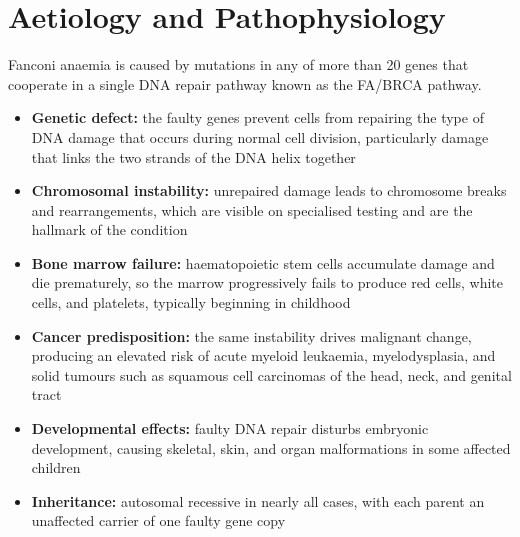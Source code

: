 \section*{Aetiology and Pathophysiology}
Fanconi anaemia is caused by mutations in any of more than 20 genes that cooperate in a single DNA repair pathway known as the FA/BRCA pathway.
\begin{itemize}
    \item \textbf{Genetic defect:} the faulty genes prevent cells from repairing the type of DNA damage that occurs during normal cell division, particularly damage that links the two strands of the DNA helix together
    \item \textbf{Chromosomal instability:} unrepaired damage leads to chromosome breaks and rearrangements, which are visible on specialised testing and are the hallmark of the condition
    \item \textbf{Bone marrow failure:} haematopoietic stem cells accumulate damage and die prematurely, so the marrow progressively fails to produce red cells, white cells, and platelets, typically beginning in childhood
    \item \textbf{Cancer predisposition:} the same instability drives malignant change, producing an elevated risk of acute myeloid leukaemia, myelodysplasia, and solid tumours such as squamous cell carcinomas of the head, neck, and genital tract
    \item \textbf{Developmental effects:} faulty DNA repair disturbs embryonic development, causing skeletal, skin, and organ malformations in some affected children
    \item \textbf{Inheritance:} autosomal recessive in nearly all cases, with each parent an unaffected carrier of one faulty gene copy
\end{itemize}

